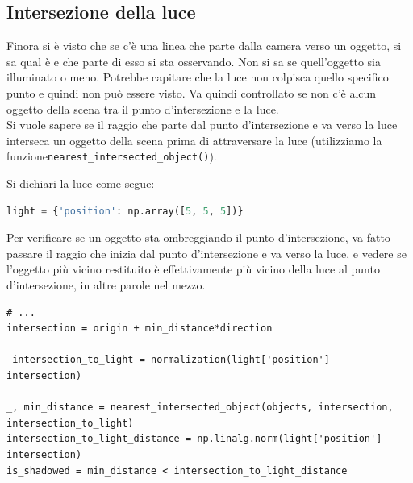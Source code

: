 \documentclass[9pt,a4paper,twoside]{tau}
\begin{document}
\subsection{Intersezione della luce}
Finora si è visto che se c'è una linea che parte dalla camera verso un oggetto, si sa qual è e che parte di esso si sta osservando. Non si sa se quell'oggetto sia illuminato o meno. Potrebbe capitare che la luce non colpisca quello specifico punto e quindi non può essere visto. Va quindi controllato se non c'è alcun oggetto della scena tra il punto d'intersezione e la luce.\\
Si vuole sapere se il raggio che parte dal punto d'intersezione e va verso la luce interseca un oggetto della scena prima di attraversare la luce (utilizziamo la funzione\texttt{nearest\_intersected\_object()}). 

Si dichiari la luce come segue:
\begin{lstlisting}[language=Python]
light = {'position': np.array([5, 5, 5])}
\end{lstlisting}
Per verificare se un oggetto sta ombreggiando il punto d'intersezione, va fatto passare il raggio che inizia dal punto d'intersezione e va verso la luce, e vedere se l'oggetto più vicino restituito è effettivamente più vicino della luce al punto d'intersezione, in altre parole nel mezzo.
\begin{lstlisting}
# ...
intersection = origin + min_distance*direction

 intersection_to_light = normalization(light['position'] - intersection)

_, min_distance = nearest_intersected_object(objects, intersection, intersection_to_light)
intersection_to_light_distance = np.linalg.norm(light['position'] - intersection)
is_shadowed = min_distance < intersection_to_light_distance
\end{lstlisting}
\end{document}

